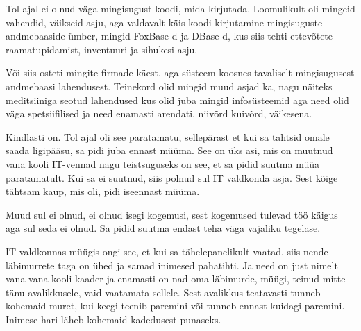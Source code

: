                  
Tol ajal ei olnud väga mingisugust koodi, mida kirjutada. Loomulikult oli 
mingeid vahendid, väikseid asju, aga valdavalt käis koodi kirjutamine 
mingisuguste andmebaaside ümber, mingid FoxBase-d ja DBase-d, kus siis tehti 
ettevõtete  raamatupidamist,  inventuuri ja sihukesi asju. 


Või siis osteti mingite firmade käest, aga süsteem koosnes tavaliselt 
mingisugusest andmebaasi lahendusest. Teinekord olid mingid muud asjad ka, nagu 
näiteks  meditsiiniga seotud lahendused kus olid juba mingid infosüsteemid aga 
need olid väga spetsiifilised ja need enamasti arendati, niivõrd kuivõrd, 
väikesena.


Kindlasti on. Tol ajal oli see paratamatu, sellepärast et kui sa tahtsid omale 
saada ligipääsu, sa pidi juba ennast müüma. See on üks asi, mis on muutnud  
vana kooli IT-vennad nagu teistsuguseks on see, et sa pidid suutma müüa 
paratamatult. Kui sa ei suutnud, siis polnud sul IT valdkonda asja. Sest kõige 
tähtsam kaup, mis oli, pidi  iseennast müüma.


Muud sul ei olnud, ei olnud isegi kogemusi, sest kogemused tulevad töö käigus 
aga sul seda ei olnud. Sa pidid suutma endast teha väga vajaliku tegelase.


IT valdkonnas müügis ongi see, et kui sa tähelepanelikult vaatad, siis nende 
läbimurrete taga on ühed ja samad inimesed pahatihti. Ja  need on just nimelt 
vana-vana-kooli kaader ja enamasti on nad oma läbimurde, müügi, teinud mitte 
tänu  avalikkusele, vaid vaatamata sellele. Sest avalikkus teatavasti tunneb 
kohemaid muret, kui keegi teenib paremini või tunneb ennast kuidagi paremini. 
Inimese hari läheb kohemaid kadedusest punaseks.
               
  
